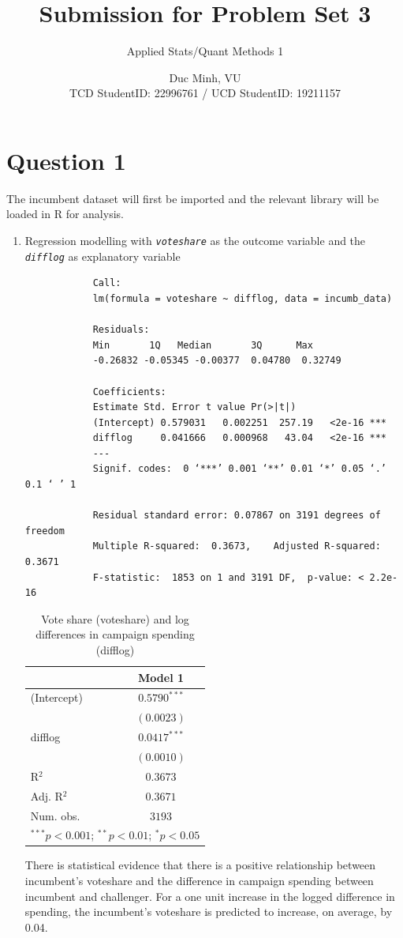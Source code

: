 \documentclass[12pt,letterpaper]{article}
\title{Submission for Problem Set 3}
\date{Duc Minh, VU \\
	TCD StudentID: 22996761 / UCD StudentID: 19211157}
\author{Applied Stats/Quant Methods 1}
\begin{document}
	\maketitle
	\section*{Question 1}
	\noindent The incumbent dataset will first be imported and the relevant library will be loaded in R for analysis.
	
	\begin{enumerate}
		\item Regression modelling with \textit{\texttt{voteshare}} as the outcome variable and the \textit{\texttt{difflog}} as explanatory variable
		
		\begin{verbatim}
			Call:
			lm(formula = voteshare ~ difflog, data = incumb_data)
			
			Residuals:
			Min       1Q   Median       3Q      Max 
			-0.26832 -0.05345 -0.00377  0.04780  0.32749 
			
			Coefficients:
			Estimate Std. Error t value Pr(>|t|)    
			(Intercept) 0.579031   0.002251  257.19   <2e-16 ***
			difflog     0.041666   0.000968   43.04   <2e-16 ***
			---
			Signif. codes:  0 ‘***’ 0.001 ‘**’ 0.01 ‘*’ 0.05 ‘.’ 0.1 ‘ ’ 1
			
			Residual standard error: 0.07867 on 3191 degrees of freedom
			Multiple R-squared:  0.3673,	Adjusted R-squared:  0.3671 
			F-statistic:  1853 on 1 and 3191 DF,  p-value: < 2.2e-16
		\end{verbatim}
		\begin{table}[H]
			\begin{center}
				\begin{tabular}{l c}
					\hline
					& Model 1 \\
					\hline
					(Intercept) & $0.5790^{***}$ \\
					& $(0.0023)$     \\
					difflog     & $0.0417^{***}$ \\
					& $(0.0010)$     \\
					\hline
					R$^2$       & $0.3673$       \\
					Adj. R$^2$  & $0.3671$       \\
					Num. obs.   & $3193$         \\
					\hline
					\multicolumn{2}{l}{\scriptsize{$^{***}p<0.001$; $^{**}p<0.01$; $^{*}p<0.05$}}
				\end{tabular}
				\caption{Vote share (voteshare) and log differences in campaign spending (difflog)}
				\label{table:coefficients}
			\end{center}
		\end{table}
	There is statistical evidence that there is a positive relationship between incumbent's voteshare and the difference in campaign spending between incumbent and challenger. For a one unit increase in the logged difference in spending, the incumbent's voteshare is predicted to increase, on average, by 0.04.
	

\end{enumerate}
\end{document}
